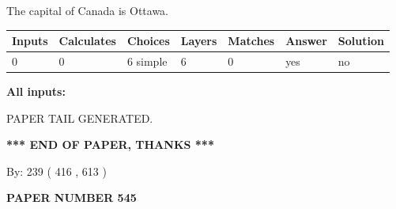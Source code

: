 \documentclass[12pt]{article}
\begin{document}
 
The capital of Canada is Ottawa.
 
 
\noindent{}
 
 
   
   
   
   
\noindent\begin{tabular}{|l|l|l|l|l|l|l|}
 \hline
Inputs & Calculates & Choices & Layers & Matches & Answer & Solution \\ \hline
 0  & 
 0  & 
 6
  simple  
  & 
 6  & 
 0  & 
  yes & 
  no 
  \\ \hline
 \end{tabular}
   
   
   
   
\noindent{}
   
   
   
   
\noindent\vspace{0.1in}\hspace{-0.08in} {\textbf{\Large{All inputs: }}}
   
   
   
   
   
   
 \vspace{0.2in}
 
   
   
\vspace{2.0in} PAPER TAIL GENERATED.
   
   
   
   
\vspace{1.0in} 
{\textbf{\large{ *** END OF PAPER, THANKS *** }}} 
   
   
\hspace{1.0in} By: 
 239 ( 416 ,  613 )
   
   
   
   
\newpage 
\setcounter{page}{ 
   545001 } 
   
   
   
   
 {\textbf{ \Large{ PAPER NUMBER  545  }}}
   
   
\vspace{0.2in}
   
   
   
   
   
   
   
\end{document}
